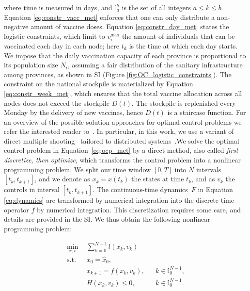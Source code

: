 where time is measured in days, and $\mathbb{I}_a^b$ is the set of all integers $a\leq k\leq b$. Equation \eqref{eq:constr_vacc_met} enforces that one can only distribute a non-negative amount of vaccine doses. Equation \eqref{eq:constr_day_met} states the logistic constraints, which limit to $v_i^\mathrm{max}$ the amount of individuals that can be vaccinated each day in each node; here $t_\mathrm{d}$ is the time at which each day starts. We impose that the daily vaccination capacity of each province is proportional to its population size $N_i$, assuming a fair distribution of the sanitary infrastructure among provinces, as shown in SI (Figure \ref{fig:OC_logistic_constraints}). The constraint on the national stockpile is materialized by Equation
\eqref{eq:constr_week_met}, which ensures that the total vaccine allocation across all nodes does not exceed the stockpile $D(t)$. The stockpile is replenished every Monday by the delivery of new vaccines, hence $D(t)$ is a staircase function.
For an overview of the possible solution approaches for optimal control problems we refer the interested reader to~\cite{Betts:PracticalMethodsOptimal:2010,Biegler:NonlinearProgramming:2010}. In particular, in this work, we use a variant of direct multiple shooting~\cite{Bock:MultipleShootingAlgorithm:1984} tailored to distributed systems~\cite{Savorgnan:MultipleShootingDistributed:2011}.We solve the optimal control problem in Equation~\eqref{eq:ocp_met} by a direct method, also called \emph{first discretize, then optimize}, which transforms the control problem into a nonlinear programming problem. We split our time window $[0,T]$ into $N$ intervals $[t_k,t_{k+1}]$, and we denote as $x_k=x(t_k)$ the states at time $t_k$, and as $v_k$ the controls in interval $[t_k,t_{k+1}]$. The continuous-time dynamics~$F$ in Equation \eqref{eq:dynamics} are transformed by numerical integration into the discrete-time operator $f$ by numerical integration. This discretization requires some care, and details are provided in the SI. We thus obtain the following nonlinear programming problem:

\begin{subequations}
    \begin{align}
        \min_{x,v} \ \ &\sum_{k=0}^{N-1} l(x_k,v_k)  \\ 
        \mathrm{s.t.} \ \ & x_0 = \hat x_0, \\
        & x_{k+1} = f(x_k,v_k), && k\in \mathbb{I}_0^{N-1}, \\
        &H(x_k,v_k) \leq 0, && k\in \mathbb{I}_0^{N-1}.
    \end{align}%
        \label{eq:ocp_nlp_met}%
\end{subequations}%


